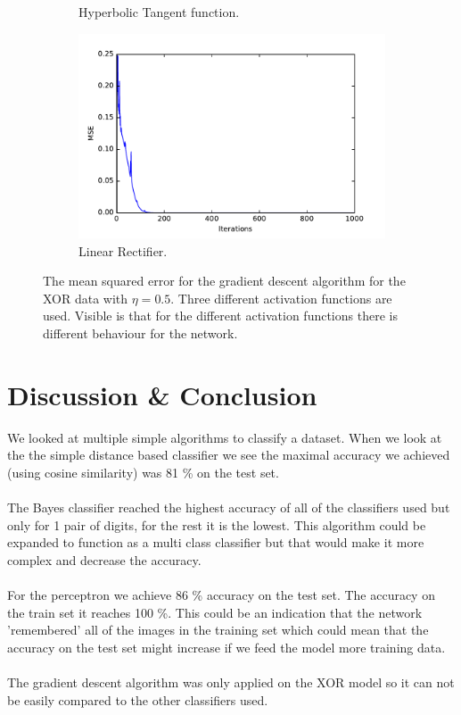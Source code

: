 \documentclass[10 pt, a4paper]{article}
\begin{document}
\begin{figure}[H]
\begin{subfigure}[b]{0.33\textwidth}
  \caption{Hyperbolic Tangent function.}
\end{subfigure}
\begin{subfigure}[b]{0.33\textwidth} 
  \centering
    \includegraphics[width=\textwidth]{xor_mse_relu}
  \caption{Linear Rectifier.}
\end{subfigure}
\caption{The mean squared error for the gradient descent algorithm for the XOR data with $\eta = 0.5$. Three different activation functions are used. Visible is that for the different activation functions there is different behaviour for the network.}
  \label{fig:xormseact}
\end{figure}


\section{Discussion \& Conclusion}

We looked at multiple simple algorithms to classify a dataset. When we look at the the simple distance based classifier we see the maximal accuracy we achieved (using cosine similarity) was 81 \% on the test set.
\\
\\
The Bayes classifier reached the highest accuracy of all of the classifiers used but only for 1 pair of digits, for the rest it is the lowest. This algorithm could be expanded to function as a multi class classifier but that would make it more complex and decrease the accuracy.
\\
\\
For the perceptron we achieve 86 \% accuracy on the test set. The accuracy on the train set it reaches 100 \%. This could be an indication that the network 'remembered' all of the images in the training set which could mean that the accuracy on the test set might increase if we feed the model more training data. 
\\
\\
The gradient descent algorithm was only applied on the XOR model so it can not be easily compared to the other classifiers used.
\end{document}
